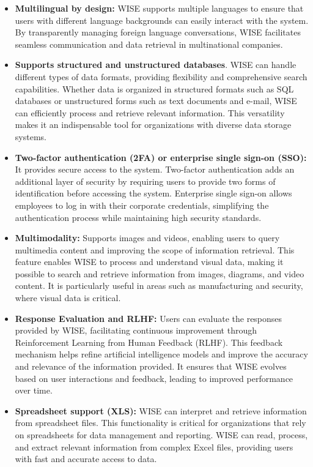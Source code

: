 \begin{itemize}
    \item \textbf{Multilingual by design:} WISE supports multiple languages to ensure that users with different language backgrounds can easily interact with the system. By transparently managing foreign language conversations, WISE facilitates seamless communication and data retrieval in multinational companies.
    
    \item \textbf{Supports structured and unstructured databases}. WISE can handle different types of data formats, providing flexibility and comprehensive search capabilities. Whether data is organized in structured formats such as SQL databases or unstructured forms such as text documents and e-mail, WISE can efficiently process and retrieve relevant information. This versatility makes it an indispensable tool for organizations with diverse data storage systems.
    
    \item \textbf{Two-factor authentication (2FA) or enterprise single sign-on (SSO):} It provides secure access to the system. Two-factor authentication adds an additional layer of security by requiring users to provide two forms of identification before accessing the system. Enterprise single sign-on allows employees to log in with their corporate credentials, simplifying the authentication process while maintaining high security standards.
    
    \item \textbf{Multimodality:} Supports images and videos, enabling users to query multimedia content and improving the scope of information retrieval. This feature enables WISE to process and understand visual data, making it possible to search and retrieve information from images, diagrams, and video content. It is particularly useful in areas such as manufacturing and security, where visual data is critical.
    
    \item \textbf{Response Evaluation and RLHF:} Users can evaluate the responses provided by WISE, facilitating continuous improvement through Reinforcement Learning from Human Feedback (RLHF). This feedback mechanism helps refine artificial intelligence models and improve the accuracy and relevance of the information provided. It ensures that WISE evolves based on user interactions and feedback, leading to improved performance over time.
    
    \item \textbf{Spreadsheet support (XLS):} WISE can interpret and retrieve information from spreadsheet files. This functionality is critical for organizations that rely on spreadsheets for data management and reporting. WISE can read, process, and extract relevant information from complex Excel files, providing users with fast and accurate access to data.
    

\end{itemize}
